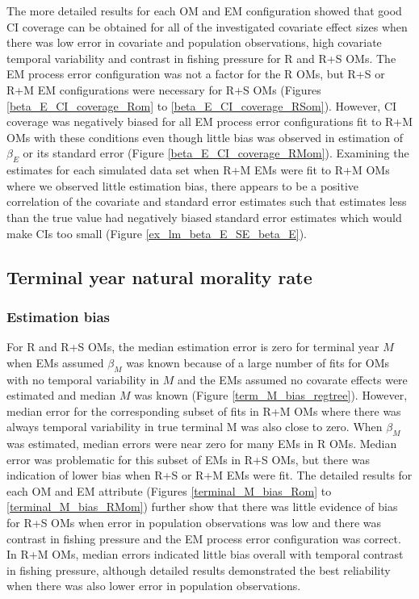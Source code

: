 \documentclass[
  12pt,
]{article}
\begin{document}
The more detailed results for each OM and EM configuration showed that
good CI coverage can be obtained for all of the investigated covariate
effect sizes when there was low error in covariate and population
observations, high covariate temporal variability and contrast in
fishing pressure for R and R+S OMs. The EM process error configuration
was not a factor for the R OMs, but R+S or R+M EM configurations were
necessary for R+S OMs (Figures \ref{beta_E_CI_coverage_Rom} to
\ref{beta_E_CI_coverage_RSom}). However, CI coverage was negatively
biased for all EM process error configurations fit to R+M OMs with these
conditions even though little bias was observed in estimation of
\(\beta_E\) or its standard error (Figure
\ref{beta_E_CI_coverage_RMom}). Examining the estimates for each
simulated data set when R+M EMs were fit to R+M OMs where we observed
little estimation bias, there appears to be a positive correlation of
the covariate and standard error estimates such that estimates less than
the true value had negatively biased standard error estimates which
would make CIs too small (Figure \ref{ex_lm_beta_E_SE_beta_E}).

\subsection*{Terminal year natural morality
rate}\label{terminal-year-natural-morality-rate}

\subsubsection*{Estimation bias}\label{estimation-bias-2}

For R and R+S OMs, the median estimation error is zero for terminal year
\(M\) when EMs assumed \(\beta_M\) was known because of a large number
of fits for OMs with no temporal variability in \(M\) and the EMs
assumed no covarate effects were estimated and median \(M\) was known
(Figure \ref{term_M_bias_regtree}). However, median error for the
corresponding subset of fits in R+M OMs where there was always temporal
variability in true terminal M was also close to zero. When \(\beta_M\)
was estimated, median errors were near zero for many EMs in R OMs.
Median error was problematic for this subset of EMs in R+S OMs, but
there was indication of lower bias when R+S or R+M EMs were fit. The
detailed results for each OM and EM attribute (Figures
\ref{terminal_M_bias_Rom} to \ref{terminal_M_bias_RMom}) further show
that there was little evidence of bias for R+S OMs when error in
population observations was low and there was contrast in fishing
pressure and the EM process error configuration was correct. In R+M OMs,
median errors indicated little bias overall with temporal contrast in
fishing pressure, although detailed results demonstrated the best
reliability when there was also lower error in population observations.
\end{document}
